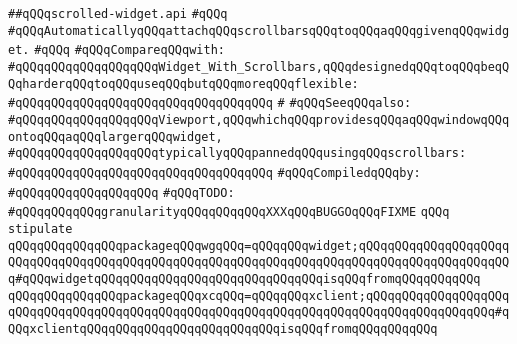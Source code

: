 \label{src/lib/x-kit/widget/old/layout/scrolled-widget.api}
\verb|##qQQqscrolled-widget.api|\newline
\verb|#qQQq|\newline
\verb|#qQQqAutomaticallyqQQqattachqQQqscrollbarsqQQqtoqQQqaqQQqgivenqQQqwidget.|\newline
\verb|#qQQq|\newline
\verb|#qQQqCompareqQQqwith:|\newline
\verb|#qQQqqQQqqQQqqQQqqQQqWidget_With_Scrollbars,qQQqdesignedqQQqtoqQQqbeqQQqharderqQQqtoqQQquseqQQqbutqQQqmoreqQQqflexible:|\newline
\verb|#qQQqqQQqqQQqqQQqqQQqqQQqqQQqqQQqqQQq|\newline
\verb|#|\newline
\verb|#qQQqSeeqQQqalso:|\newline
\verb|#qQQqqQQqqQQqqQQqqQQqViewport,qQQqwhichqQQqprovidesqQQqaqQQqwindowqQQqontoqQQqaqQQqlargerqQQqwidget,|\newline
\verb|#qQQqqQQqqQQqqQQqqQQqtypicallyqQQqpannedqQQqusingqQQqscrollbars:|\newline
\verb|#qQQqqQQqqQQqqQQqqQQqqQQqqQQqqQQqqQQq|\newline
\newline
\verb|#qQQqCompiledqQQqby:|\newline
\verb|#qQQqqQQqqQQqqQQqqQQq|\newline
\newline
\newline
\verb|#qQQqTODO:|\newline
\verb|#qQQqqQQqqQQqgranularityqQQqqQQqqQQqXXXqQQqBUGGOqQQqFIXME|\newline
\verb|qQQq|\newline
\verb|stipulate|\newline
\verb|qQQqqQQqqQQqqQQqpackageqQQqwgqQQq=qQQqqQQqwidget;qQQqqQQqqQQqqQQqqQQqqQQqqQQqqQQqqQQqqQQqqQQqqQQqqQQqqQQqqQQqqQQqqQQqqQQqqQQqqQQqqQQqqQQqqQQq#qQQqwidgetqQQqqQQqqQQqqQQqqQQqqQQqqQQqqQQqisqQQqfromqQQqqQQqqQQq|\newline
\verb|qQQqqQQqqQQqqQQqpackageqQQqxcqQQq=qQQqqQQqxclient;qQQqqQQqqQQqqQQqqQQqqQQqqQQqqQQqqQQqqQQqqQQqqQQqqQQqqQQqqQQqqQQqqQQqqQQqqQQqqQQqqQQqqQQq#qQQqxclientqQQqqQQqqQQqqQQqqQQqqQQqqQQqisqQQqfromqQQqqQQqqQQq|\newline
